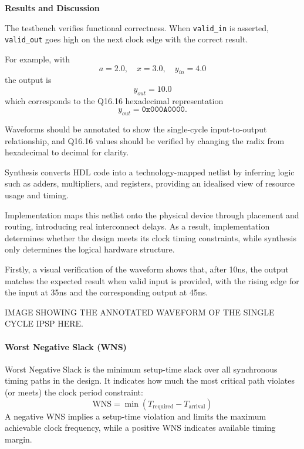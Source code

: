 \documentclass[a4paper,12pt]{article}
\begin{document}
\textbf{Results and Discussion}

The testbench verifies functional correctness. When \texttt{valid\_in} is asserted, \texttt{valid\_out} goes high on the next clock edge with the correct result.

For example, with
\begin{equation}
a = 2.0, \quad x = 3.0, \quad y_{in} = 4.0
\end{equation}
the output is
\begin{equation}
y_{out} = 10.0
\end{equation}
which corresponds to the Q16.16 hexadecimal representation
\begin{equation}
y_{out} = \texttt{0x000A0000}.
\end{equation}

Waveforms should be annotated to show the single-cycle input-to-output relationship, and Q16.16 values should be verified by changing the radix from hexadecimal to decimal for clarity.

Synthesis converts HDL code into a technology-mapped netlist by inferring logic such as adders, multipliers, and registers, providing an idealised view of resource usage and timing. 

Implementation maps this netlist onto the physical device through placement and routing, introducing real interconnect delays. As a result, implementation determines whether the design meets its clock timing constraints, while synthesis only determines the logical hardware structure.

Firstly, a visual verification of the waveform shows that, after 10ns, the output matches the expected result when valid input is provided, with the rising edge for the input at 35ns and the corresponding output at 45ns.

\begin{large}
    IMAGE SHOWING THE ANNOTATED WAVEFORM OF THE SINGLE CYCLE IPSP HERE. 
\end{large}

\paragraph{Worst Negative Slack (WNS)}
Worst Negative Slack is the minimum setup-time slack over all synchronous timing paths in the design. It indicates how much the most critical path violates (or meets) the clock period constraint:
\[
\text{WNS} = \min \left( T_{\text{required}} - T_{\text{arrival}} \right)
\]
A negative WNS implies a setup-time violation and limits the maximum achievable clock frequency, while a positive WNS indicates available timing margin.
\end{document}
